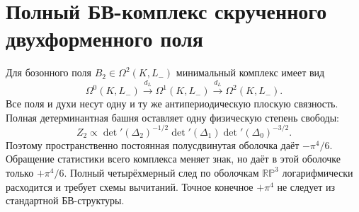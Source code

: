 \section*{Полный БВ-комплекс скрученного двухформенного поля}

Для бозонного поля \(B_2\in\Omega^2(K,L_-)\) минимальный комплекс имеет вид
\[
 \Omega^0(K,L_-)\xrightarrow{d_L}
 \Omega^1(K,L_-)\xrightarrow{d_L}
 \Omega^2(K,L_-).
\]
Все поля и духи несут одну и ту же антипериодическую плоскую связность.
Полная детерминантная башня оставляет одну физическую степень свободы:
\[
 Z_2\propto
 \det{}'(\Delta_2)^{-1/2}
 \det{}'(\Delta_1)
 \det{}'(\Delta_0)^{-3/2}.
\]
Поэтому пространственно постоянная полусдвинутая оболочка даёт
\(-\pi^4/6\). Обращение статистики всего комплекса меняет знак, но даёт в
этой оболочке только \(+\pi^4/6\). Полный четырёхмерный след по оболочкам
\(\mathbb{RP}^3\) логарифмически расходится и требует схемы вычитаний. Точное
конечное \(+\pi^4\) не следует из стандартной БВ-структуры.